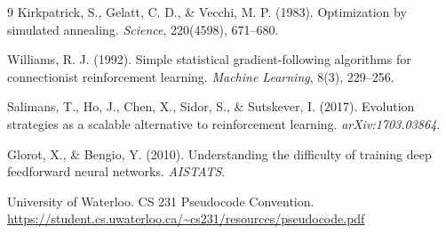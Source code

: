 \documentclass[11pt,a4paper]{article}
\begin{document}
\begin{thebibliography}{9}
Kirkpatrick, S., Gelatt, C. D., \& Vecchi, M. P. (1983). Optimization by simulated annealing. \textit{Science}, 220(4598), 671--680.

Williams, R. J. (1992). Simple statistical gradient-following algorithms for connectionist reinforcement learning. \textit{Machine Learning}, 8(3), 229--256.

Salimans, T., Ho, J., Chen, X., Sidor, S., \& Sutskever, I. (2017). Evolution strategies as a scalable alternative to reinforcement learning. \textit{arXiv:1703.03864}.

Glorot, X., \& Bengio, Y. (2010). Understanding the difficulty of training deep feedforward neural networks. \textit{AISTATS}.

University of Waterloo. CS 231 Pseudocode Convention. \\
\url{https://student.cs.uwaterloo.ca/~cs231/resources/pseudocode.pdf}
\end{thebibliography}
\end{document}
